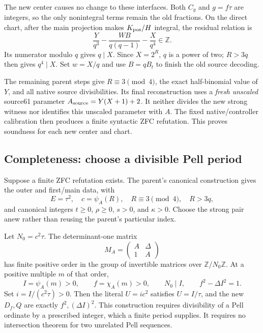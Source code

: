 The new center causes no change to these interfaces.  Both $C_g$
and $g=f\tau$ are integers, so the only nonintegral terms remain
the old fractions.  On the direct chart, after the main projection
makes $K_{\rm pos}/H$ integral, the residual relation is
\[
 \frac{Y}{q^3}-\frac{WB}{q(q-1)}-\frac{X}{q^4}\in\mathbb Z.
\]
Its numerator modulo $q$ gives $q\mid X$.  Since $X=2^R$,
$q$ is a power of two; $R>3q$ then gives $q^4\mid X$.
Set $w=X/q$ and use $B=qB_t$ to finish the old source decoding.

The remaining parent steps give $R\equiv3\pmod4$, the exact
half-binomial value of $Y$, and all native source divisibilities.
Its final reconstruction uses a \emph{fresh unscaled} source61
parameter $A_{\rm source}=Y(X+1)+2$.  It neither divides the new
strong witness nor identifies this unscaled parameter with $A$.
The fixed native/controller calibration then produces a finite
syntactic ZFC refutation.  This proves soundness for each new
center and chart.

\subsection{Completeness: choose a divisible Pell period}

Suppose a finite ZFC refutation exists.  The parent's canonical
construction gives the outer and first/main data, with
\[
 E=\tau^2,\quad c=\psi_A(R),\quad
 R\equiv3\pmod4,\quad R>3q,
\]
and canonical integers $t\ge0$, $\rho\ge0$, $s>0$, and
$\kappa>0$.  Choose the strong pair anew rather than reusing the
parent's particular index.

Let $N_0=c^2\tau$.  The determinant-one matrix
\[
 M_A=\begin{pmatrix}A&\Delta\\1&A\end{pmatrix}
\]
has finite positive order in the group of invertible matrices over
$\mathbb Z/N_0\mathbb Z$.  At a positive multiple $m$ of that order,
\[
 I=\psi_A(m)>0,\qquad f=\chi_A(m)>0,
 \qquad N_0\mid I,\qquad f^2-\Delta I^2=1.
\]
Set $i=I/(c^2\tau)>0$.  Then the literal $U=ic^2$ satisfies
$U=I/\tau$, and the new $D_f,Q$ are exactly $f^2,(\Delta I)^2$.
This construction requires divisibility of a Pell ordinate by a
prescribed integer, which a finite period supplies.  It requires
no intersection theorem for two unrelated Pell sequences.

